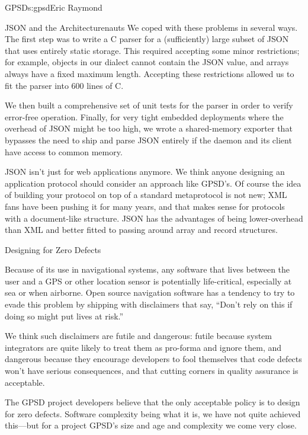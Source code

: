 \begin{aosachapter}{GPSD}{s:gpsd}{Eric Raymond}
\begin{aosasect1}{JSON and the Architecturenauts}
We coped with these problems in several ways. The first step was to
write a C parser for a (sufficiently) large subset of JSON that uses
entirely static storage.  This required accepting some minor
restrictions; for example, objects in our dialect cannot contain the
JSON  value, and arrays always have a fixed maximum length.
Accepting these restrictions allowed us to fit the parser into 600
lines of C.

We then built a comprehensive set of unit tests for the parser 
in order to verify error-free operation. Finally, for very tight
embedded deployments where the overhead of JSON might be too high,
we wrote a shared-memory exporter that bypasses the need to
ship and parse JSON entirely if the daemon and its client have
access to common memory.

JSON isn't just for web applications anymore.  We think anyone
designing an application protocol should consider an approach like
GPSD's.  Of course the idea of building your protocol on top of a
standard metaprotocol is not new; XML fans have been pushing it for
many years, and that makes sense for protocols with a document-like
structure. JSON has the advantages of being lower-overhead than XML
and better fitted to passing around array and record structures.

\end{aosasect1}

\begin{aosasect1}{Designing for Zero Defects}

Because of its use in navigational systems, any software that lives
between the user and a GPS or other location sensor is potentially
life-critical, especially at sea or when airborne.  Open source
navigation software has a tendency to try to evade this problem by
shipping with disclaimers that say, ``Don't rely on this if doing so
might put lives at risk.''

We think such disclaimers are futile and dangerous: futile because
system integrators are quite likely to treat them as pro-forma and
ignore them, and dangerous because they encourage developers to fool
themselves that code defects won't have serious consequences, and that
cutting corners in quality assurance is acceptable.

The GPSD project developers believe that the only acceptable policy is
to design for zero defects. Software complexity being what it is, we
have not quite achieved this---but for a project GPSD's size and age
and complexity we come very close.


\end{aosasect1}
\end{aosachapter}
